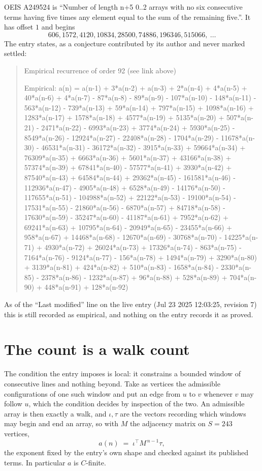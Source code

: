 \documentclass[11pt,a4paper]{article}
\theoremstyle{plain}
\theoremstyle{definition}
\begin{document}
OEIS A249524 is ``Number of length n+5 0..2 arrays with no six consecutive terms having five times any element equal to the sum of the remaining five.''. It has offset $1$ and begins
\[
606, 1572, 4120, 10834, 28500, 74886, 196346, 515066,\ \dots
\]
The entry states, as a conjecture contributed by its author and never marked settled:
\begin{quote}\raggedright\small
Empirical recurrence of order 92 (see link above)

Empirical: a(n) = a(n-1) + 3*a(n-2) + a(n-3) + 2*a(n-4) + 4*a(n-5) + 40*a(n-6) + 4*a(n-7) - 87*a(n-8) - 89*a(n-9) - 107*a(n-10) - 148*a(n-11) - 563*a(n-12) - 739*a(n-13) + 59*a(n-14) + 797*a(n-15) + 1098*a(n-16) + 1283*a(n-17) + 1578*a(n-18) + 4577*a(n-19) + 5135*a(n-20) + 507*a(n-21) - 2471*a(n-22) - 6993*a(n-23) + 3774*a(n-24) + 5930*a(n-25) - 8549*a(n-26) - 12924*a(n-27) - 22408*a(n-28) - 1704*a(n-29) - 11678*a(n-30) - 46531*a(n-31) - 36172*a(n-32) - 3915*a(n-33) + 59664*a(n-34) + 76309*a(n-35) + 6663*a(n-36) + 5601*a(n-37) + 43166*a(n-38) + 57374*a(n-39) + 67841*a(n-40) - 57577*a(n-41) + 3930*a(n-42) + 87540*a(n-43) + 64584*a(n-44) + 29362*a(n-45) - 161581*a(n-46) - 112936*a(n-47) - 4905*a(n-48) + 6528*a(n-49) - 14176*a(n-50) - 117655*a(n-51) - 104988*a(n-52) + 22122*a(n-53) - 19100*a(n-54) - 17531*a(n-55) - 21860*a(n-56) - 6870*a(n-57) + 84718*a(n-58) - 17630*a(n-59) - 35247*a(n-60) - 41187*a(n-61) + 7952*a(n-62) + 69241*a(n-63) + 10795*a(n-64) - 20949*a(n-65) - 23455*a(n-66) + 958*a(n-67) + 14468*a(n-68) - 12670*a(n-69) - 30768*a(n-70) - 14225*a(n-71) + 4930*a(n-72) + 26024*a(n-73) + 17326*a(n-74) - 863*a(n-75) - 7164*a(n-76) - 9124*a(n-77) - 156*a(n-78) + 1494*a(n-79) + 3290*a(n-80) + 3139*a(n-81) + 424*a(n-82) + 510*a(n-83) - 1658*a(n-84) - 2330*a(n-85) - 2378*a(n-86) - 1232*a(n-87) + 96*a(n-88) + 528*a(n-89) + 704*a(n-90) + 448*a(n-91) + 128*a(n-92)
\end{quote}
As of the ``Last modified'' line on the live entry (Jul 23 2025 12:03:25, revision 7) this is still
recorded as empirical, and nothing on the entry records it as proved.

\section{The count is a walk count}

The condition the entry imposes is local: it constrains a bounded window of consecutive lines and nothing beyond. Take as vertices the admissible configurations of one such window and put an edge from $u$ to $v$ whenever $v$ may follow $u$, which the condition decides by inspection of the two.
An admissible array is then exactly a walk, and $\iota,\tau$ are the vectors recording which windows may begin and end an array, so with $M$ the adjacency matrix on $S=243$ vertices,
\[
a(n)\;=\;\iota^{\!\top}M^{\,n-1}\tau ,
\]
the exponent fixed by the entry's own shape and checked against its published terms. In
particular $a$ is $C$-finite.
\end{document}
